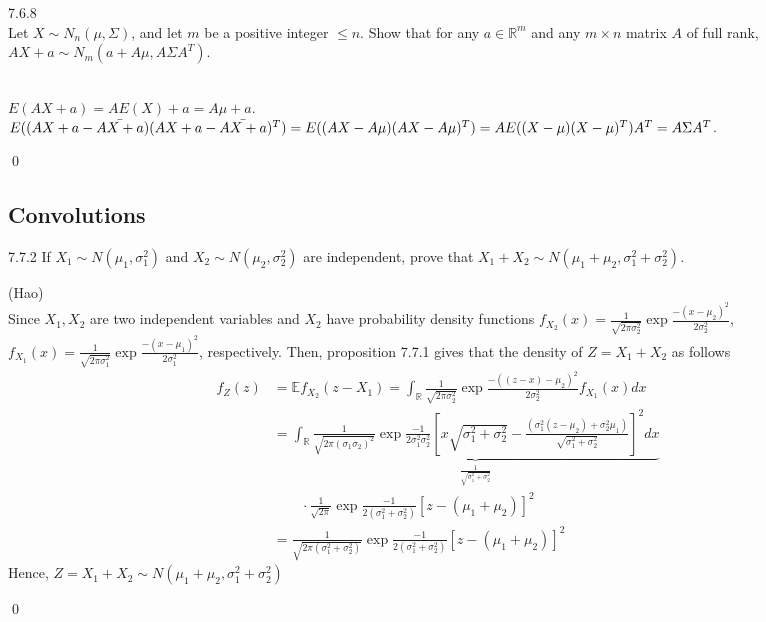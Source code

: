 \begin{exercise}7.6.8
\\
Let $X \sim N_{n}(\mu, \Sigma)$, and let $m$ be a positive integer $\leq n$. Show that for any $a \in \mathbb{R}^m$ and any $m \times n$ matrix $A$ of full rank, $AX+a \sim N_m(a+A\mu, A\Sigma A^T)$.
\begin{answer}\\
$E(AX+a) = AE(X)+a = A\mu+a$.\\
$E((AX+a-\Bar{AX+a})(AX+a-\Bar{AX+a})^T)= E((AX-A\mu)(AX-A\mu)^T) = AE((X-\mu)(X-\mu)^T)A^T = A\Sigma A^T $.
\end{answer}
\qed \qquad
\end{exercise}

\subsection{Convolutions}
\begin{exercise} 7.7.2
 If $X_1 \sim N(\mu_1, \sigma_1^2)$ and $X_2 \sim N(\mu_2, \sigma_2^2)$ are independent, prove that $X_1 + X_2 \sim N(\mu_1+ \mu_2, \sigma_1^2 + \sigma_2^2)$.
\end{exercise}
\begin{answer}(Hao) \\
Since $X_1,X_2$ are two independent variables and $X_2$ have probability density functions $f_{X_2}(x) = \frac{1}{\sqrt{2\pi \sigma_2^2}} \exp{\frac{-(x-\mu_2)^2}{2\sigma_2^2}}$, $f_{X_1}(x) = \frac{1}{\sqrt{2\pi \sigma_1^2}} \exp{\frac{-(x-\mu_1)^2}{2\sigma_1^2}}$, respectively. Then, proposition 7.7.1 gives that the density of $Z = X_1 + X_2$ as follows
\begin{equation*}
    \begin{aligned}
        f_Z(z)  &= \mathbb{E}f_{X_2}(z - X_1)  = \int_\mathbb{R} \frac{1}{\sqrt{2\pi \sigma_2^2}} \exp{\frac{-((z-x)-\mu_2)^2}{2\sigma_2^2}} f_{X_1}(x) dx
        \\ &= \underbrace{\int_\mathbb{R}  \frac{1}{\sqrt{2\pi (\sigma_1\sigma_2)^2}} \exp{ \frac{-1}{2\sigma_1^2\sigma_2^2} \left[ x\sqrt{\sigma_1^2 + \sigma_2^2}  - \frac{(\sigma_1^2(z-\mu_2) + \sigma_2^2\mu_1)}{\sqrt{\sigma_1^2 + \sigma_2^2}}\right]^2} dx}_{\frac{1}{\sqrt{\sigma_1^2 + \sigma_2^2}}} 
        \\ &\qquad \cdot \frac{1}{\sqrt{2 \pi} } \exp{\frac{-1}{2(\sigma_1^2 + \sigma_2^2)} \left[ z - (\mu_1 + \mu_2) \right]^2}  
        \\ &= \frac{1}{\sqrt{2 \pi (\sigma_1^2 + \sigma_2^2)} } \exp{\frac{-1}{2(\sigma_1^2 + \sigma_2^2)} \left[ z - (\mu_1 + \mu_2) \right]^2}  
    \end{aligned}
\end{equation*}
    Hence, $Z = X_1 + X_2 \sim N(\mu_1+ \mu_2, \sigma_1^2 + \sigma_2^2)$

\end{answer}\qed \qquad

